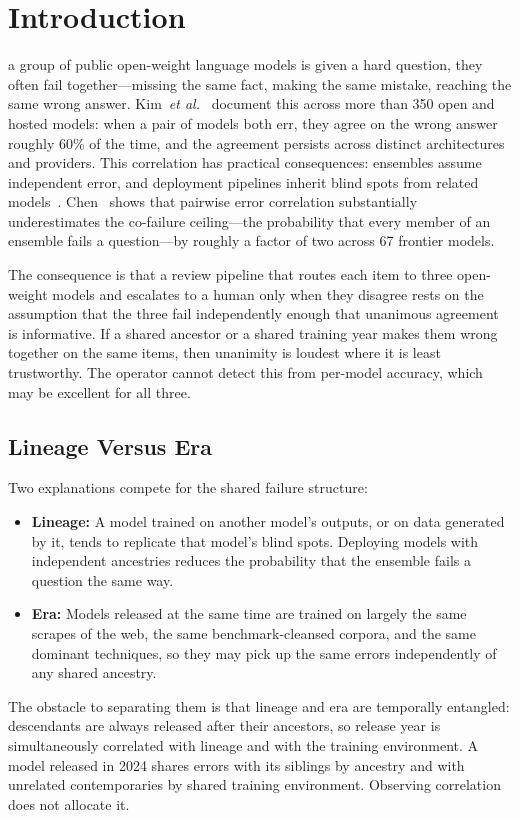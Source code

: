 \documentclass{ieeeaccess}
\theoremstyle{definition}
\theoremstyle{plain}
\begin{document}
\maketitle

\section{Introduction}
\label{sec:introduction}

 a group of public open-weight language models is given a hard question, they often fail together---missing the same fact, making the same mistake, reaching the same wrong answer. Kim~\textit{et al.}~\cite{kim2025} document this across more than 350 open and hosted models: when a pair of models both err, they agree on the wrong answer roughly 60\% of the time, and the agreement persists across distinct architectures and providers. This correlation has practical consequences: ensembles assume independent error, and deployment pipelines inherit blind spots from related models~\cite{li2026roots}. Chen~\cite{chen2026} shows that pairwise error correlation substantially underestimates the co-failure ceiling---the probability that every member of an ensemble fails a question---by roughly a factor of two across 67 frontier models.

The consequence is that a review pipeline that routes each item to three open-weight models and escalates to a human only when they disagree rests on the assumption that the three fail independently enough that unanimous agreement is informative. If a shared ancestor or a shared training year makes them wrong together on the same items, then unanimity is loudest where it is least trustworthy. The operator cannot detect this from per-model accuracy, which may be excellent for all three.

\subsection{Lineage Versus Era}
Two explanations compete for the shared failure structure:
\begin{itemize}
\item \textbf{Lineage:} A model trained on another model's outputs, or on data generated by it, tends to replicate that model's blind spots. Deploying models with independent ancestries reduces the probability that the ensemble fails a question the same way.
\item \textbf{Era:} Models released at the same time are trained on largely the same scrapes of the web, the same benchmark-cleansed corpora, and the same dominant techniques, so they may pick up the same errors independently of any shared ancestry.
\end{itemize}
The obstacle to separating them is that lineage and era are temporally entangled: descendants are always released after their ancestors, so release year is simultaneously correlated with lineage and with the training environment. A model released in 2024 shares errors with its siblings by ancestry and with unrelated contemporaries by shared training environment. Observing correlation does not allocate it.
\end{document}
